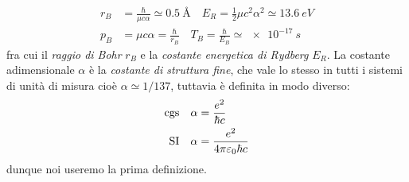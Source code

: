 \begin{align*}
  r_B &= \frac{\hbar}{\mu c \alpha} \simeq \SI{0.5}{\angstrom} \quad E_R = \frac12 \mu c^2 \alpha^2  \simeq \SI{13.6}{eV} 
  \\
  p_B &= \mu c \alpha =  \frac\hbar{r_B} \quad T_B = \frac\hbar{E_B} \simeq \SI{e-17}{s}
\end{align*}
fra cui il \textit{raggio di Bohr} $ r_B $ e la \textit{costante energetica di Rydberg} $ E_R $. La costante adimensionale $ \alpha $ è la 
\textit{costante di struttura fine}, che vale lo stesso in tutti i sistemi di unità di misura cioè $ \alpha \simeq 1/137 $, tuttavia è definita in 
modo diverso:
\begin{align*}
  \text{cgs} \quad \alpha &= \frac{e^2}{\hbar c}
  \\
  \text{SI} \quad \alpha &= \frac{e^2}{4 \pi \varepsilon_0 \hbar c}
\end{align*}
dunque noi useremo la prima definizione. 

